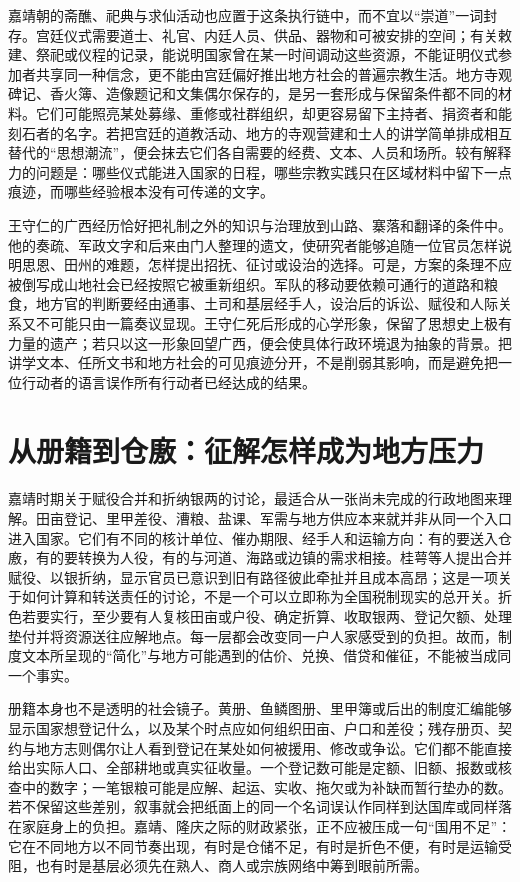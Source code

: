 嘉靖朝的斋醮、祀典与求仙活动也应置于这条执行链中，而不宜以“崇道”一词封存。宫廷仪式需要道士、礼官、内廷人员、供品、器物和可被安排的空间；有关敕建、祭祀或仪程的记录，能说明国家曾在某一时间调动这些资源，不能证明仪式参加者共享同一种信念，更不能由宫廷偏好推出地方社会的普遍宗教生活。地方寺观碑记、香火簿、造像题记和文集偶尔保存的，是另一套形成与保留条件都不同的材料。它们可能照亮某处募缘、重修或社群组织，却更容易留下主持者、捐资者和能刻石者的名字。若把宫廷的道教活动、地方的寺观营建和士人的讲学简单排成相互替代的“思想潮流”，便会抹去它们各自需要的经费、文本、人员和场所。较有解释力的问题是：哪些仪式能进入国家的日程，哪些宗教实践只在区域材料中留下一点痕迹，而哪些经验根本没有可传递的文字。

王守仁的广西经历恰好把礼制之外的知识与治理放到山路、寨落和翻译的条件中。他的奏疏、军政文字和后来由门人整理的遗文，使研究者能够追随一位官员怎样说明思恩、田州的难题，怎样提出招抚、征讨或设治的选择。可是，方案的条理不应被倒写成山地社会已经按照它被重新组织。军队的移动要依赖可通行的道路和粮食，地方官的判断要经由通事、土司和基层经手人，设治后的诉讼、赋役和人际关系又不可能只由一篇奏议显现。王守仁死后形成的心学形象，保留了思想史上极有力量的遗产；若只以这一形象回望广西，便会使具体行政环境退为抽象的背景。把讲学文本、任所文书和地方社会的可见痕迹分开，不是削弱其影响，而是避免把一位行动者的语言误作所有行动者已经达成的结果。

\section{从册籍到仓廒：征解怎样成为地方压力}

嘉靖时期关于赋役合并和折纳银两的讨论，最适合从一张尚未完成的行政地图来理解。田亩登记、里甲差役、漕粮、盐课、军需与地方供应本来就并非从同一个入口进入国家。它们有不同的核计单位、催办期限、经手人和运输方向：有的要送入仓廒，有的要转换为人役，有的与河道、海路或边镇的需求相接。桂萼等人提出合并赋役、以银折纳，显示官员已意识到旧有路径彼此牵扯并且成本高昂；这是一项关于如何计算和转送责任的讨论，不是一个可以立即称为全国税制现实的总开关。折色若要实行，至少要有人复核田亩或户役、确定折算、收取银两、登记欠额、处理垫付并将资源送往应解地点。每一层都会改变同一户人家感受到的负担。故而，制度文本所呈现的“简化”与地方可能遇到的估价、兑换、借贷和催征，不能被当成同一个事实。

册籍本身也不是透明的社会镜子。黄册、鱼鳞图册、里甲簿或后出的制度汇编能够显示国家想登记什么，以及某个时点应如何组织田亩、户口和差役；残存册页、契约与地方志则偶尔让人看到登记在某处如何被援用、修改或争讼。它们都不能直接给出实际人口、全部耕地或真实征收量。一个登记数可能是定额、旧额、报数或核查中的数字；一笔银粮可能是应解、起运、实收、拖欠或为补缺而暂行垫办的数。若不保留这些差别，叙事就会把纸面上的同一个名词误认作同样到达国库或同样落在家庭身上的负担。嘉靖、隆庆之际的财政紧张，正不应被压成一句“国用不足”：它在不同地方以不同节奏出现，有时是仓储不足，有时是折色不便，有时是运输受阻，也有时是基层必须先在熟人、商人或宗族网络中筹到眼前所需。

